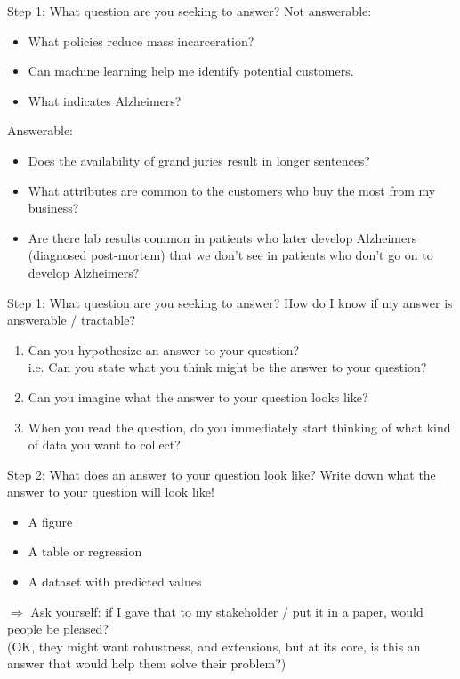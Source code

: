 \documentclass[11pt]{beamer}
\begin{document}
\begin{frame}[c]{Step 1: What \alert{question} are you seeking to answer?}
Not answerable:
\begin{itemize}
  \item What policies reduce mass incarceration?
  \item Can machine learning help me identify potential customers.
  \item What indicates Alzheimers?
\end{itemize}
\pause
Answerable:
\begin{itemize}
  \item Does the availability of grand juries result in longer sentences?
  \item What attributes are common to the customers who buy the most from my business?
  \item Are there lab results common in patients who later develop Alzheimers (diagnosed post-mortem) that we don't see in patients who don't go on to develop Alzheimers?
\end{itemize}
\end{frame}

\begin{frame}[c]{Step 1: What \alert{question} are you seeking to answer?}
How do I know if my answer is answerable / tractable?

\begin{enumerate}
  \pause \item Can you hypothesize an answer to your question? \\
  i.e. Can you state what you think might be the answer to your question?
  \pause \item Can you imagine what the answer to your question looks like?
  \pause \item When you read the question, do you immediately start thinking of what kind of data you want to collect?
\end{enumerate}
\end{frame}

\begin{frame}[c]{Step 2: What does \alert{an answer} to your question look like?}
\alert{Write down} what the answer to your question will look like!
\pause
\begin{itemize}
  \item A figure
  \item A table or regression
  \item A dataset with predicted values
\end{itemize}
\pause
$\Rightarrow$ Ask yourself: if I gave that to my stakeholder / put it in a paper, would people be pleased?\\
\pause (OK, they might want robustness, and extensions, but at its core, is this an answer that would help them solve their problem?)
\end{frame}
\end{document}
